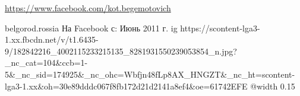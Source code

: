  
 
 
 
 

\url{https://www.facebook.com/kot.begemotovich}\par
belgorod.rossia
На Facebook с: Июнь 2011 г.
\ifcmt
  ig https://scontent-lga3-1.xx.fbcdn.net/v/t1.6435-9/182842216_4002115233215135_8281931550239053854_n.jpg?_nc_cat=104&ccb=1-5&_nc_sid=174925&_nc_ohc=Wbfjn48fLp8AX_HNGZT&_nc_ht=scontent-lga3-1.xx&oh=30e89dddc067f8fb172d21d2141a8ef4&oe=61742EFE
  @width 0.15
\fi

